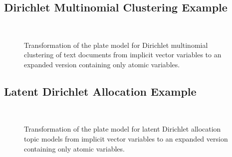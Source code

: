 \subsection{Dirichlet Multinomial Clustering Example}

\begin{figure}[t]
\begin{minipage}[t]{0.49\linewidth}
	\begin{center}
	\end{center}
\end{minipage}
\hspace{0.0cm}
\begin{minipage}[t]{0.49\linewidth}
	\begin{center}
	\end{center}
\end{minipage}\\
\caption{Transformation of the plate model for Dirichlet multinomial clustering of text documents from implicit vector variables to an expanded version containing only atomic variables.}
\label{img:clustering_platemodels}
\end{figure}

\subsection{Latent Dirichlet Allocation Example}

\begin{figure}[t]
\begin{minipage}[t]{0.49\linewidth}
	\begin{center}
	\end{center}
\end{minipage}
\hspace{0.0cm}
\begin{minipage}[t]{0.49\linewidth}
	\begin{center}
	\end{center}
\end{minipage}\\
\caption{Transformation of the plate model for latent Dirichlet allocation topic models from implicit vector variables to an expanded version containing only atomic variables.}
\label{img:topic_platemodels}
\end{figure}

